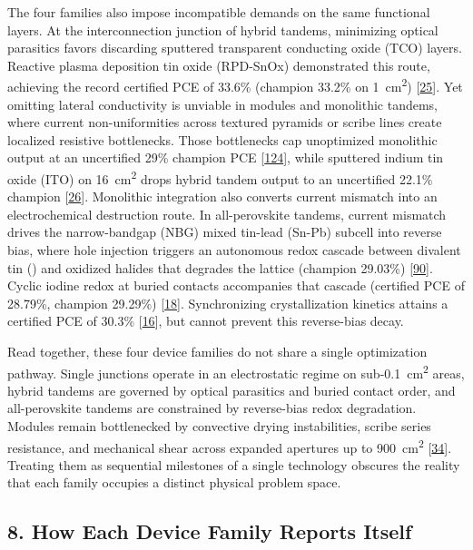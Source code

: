 \documentclass[
  11pt,
]{article}
\begin{document}
The four families also impose incompatible demands on the same
functional layers. At the interconnection junction of hybrid tandems,
minimizing optical parasitics favors discarding sputtered transparent
conducting oxide (TCO) layers. Reactive plasma deposition tin oxide
(RPD-SnOx) demonstrated this route, achieving the record certified PCE
of 33.6\% (champion 33.2\% on \qty{1}{\centi\meter\squared})
{[}\href{https://doi.org/10.1126/science.aef5355}{25}{]}. Yet omitting
lateral conductivity is unviable in modules and monolithic tandems,
where current non-uniformities across textured pyramids or scribe lines
create localized resistive bottlenecks. Those bottlenecks cap
unoptimized monolithic output at an uncertified 29\% champion PCE
{[}\href{https://doi.org/10.1002/smll.202513958}{124}{]}, while
sputtered indium tin oxide (ITO) on \qty{16}{\centi\meter\squared} drops
hybrid tandem output to an uncertified 22.1\% champion
{[}\href{https://doi.org/10.1016/j.solmat.2026.114223}{26}{]}.
Monolithic integration also converts current mismatch into an
electrochemical destruction route. In all-perovskite tandems, current
mismatch drives the narrow-bandgap (NBG) mixed tin-lead (Sn-Pb) subcell
into reverse bias, where hole injection triggers an autonomous redox
cascade between divalent tin () and oxidized halides that
degrades the lattice (champion 29.03\%)
{[}\href{https://doi.org/10.1002/adma.202522942}{90}{]}. Cyclic iodine
redox at buried contacts accompanies that cascade (certified PCE of
28.79\%, champion 29.29\%)
{[}\href{https://doi.org/10.1002/anie.4918900}{18}{]}. Synchronizing
crystallization kinetics attains a certified PCE of 30.3\%
{[}\href{https://doi.org/10.1038/s41565-026-02165-6}{16}{]}, but cannot
prevent this reverse-bias decay.

Read together, these four device families do not share a single
optimization pathway. Single junctions operate in an electrostatic
regime on sub-\qty{0.1}{\centi\meter\squared} areas, hybrid tandems are
governed by optical parasitics and buried contact order, and
all-perovskite tandems are constrained by reverse-bias redox
degradation. Modules remain bottlenecked by convective drying
instabilities, scribe series resistance, and mechanical shear across
expanded apertures up to \qty{900}{\centi\meter\squared}
{[}\href{https://doi.org/10.1002/adfm.202532205}{34}{]}. Treating them
as sequential milestones of a single technology obscures the reality
that each family occupies a distinct physical problem space.

\subsection{8. How Each Device Family Reports
Itself}\label{how-each-device-family-reports-itself}
\end{document}
